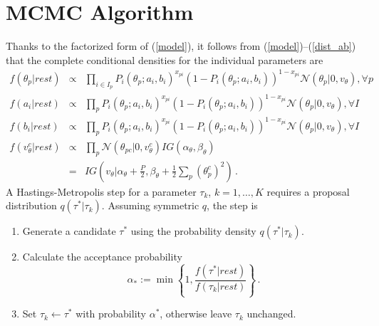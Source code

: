 \documentclass{article}
\newcommand{\Normal}{\mathcal{N}}
\newcommand{\st}{v_{\ta}}
\newcommand{\ta}{\theta}
\begin{document}
\section{MCMC Algorithm}
Thanks to the factorized form of (\ref{model}), it follows from (\ref{model})--(\ref{dist_ab}) that the complete conditional densities for the individual parameters are
\begin{eqnarray}
  f(\ta_p|rest) &\propto& \prod_{i \in I_p} 
  P_i(\ta_p;a_i,b_i)^{x_{pi}} 
  \left(1 - P_i(\ta_p;a_i,b_i)\right)^{1-x_{pi}} 
  \Normal(\ta_p|0,\st),\forall p\,
  \label{cond_ta}
  \\
  f(a_i|rest) &\propto& \prod_{p} 
  P_i(\ta_p;a_i,b_i)^{x_{pi}} 
  \left(1 - P_i(\ta_p;a_i,b_i)\right)^{1-x_{pi}} 
  \Normal(\ta_p|0,\st),\forall I\,
  \label{cond_a}
  \\
  f(b_i|rest) &\propto& \prod_{p} 
  P_i(\ta_p;a_i,b_i)^{x_{pi}} 
  \left(1 - P_i(\ta_p;a_i,b_i)\right)^{1-x_{pi}} 
  \Normal(\ta_p|0,\st),\forall I\,
  \label{cond_b}
  \\
  f(\st^c|rest) &\propto& \prod_{p} 
  \Normal(\ta_{pc}|0,\st^c) IG(\alpha_{\ta},\beta_{\ta}) \\
  &=& IG\left(\st|\alpha_{\ta} + \frac{P}{2}, \beta_{\ta} + \frac12 \sum_p (\ta_p^c)^2\right)\,.
  \label{cond_st}
\end{eqnarray}
A Hastings-Metropolis step for a parameter $\tau_k$, $k=1,\dots,K$ requires a proposal distribution $q(\tau^*|\tau_k)$. Assuming symmetric $q$, the step is
\begin{enumerate}
	\item Generate a candidate $\tau^*$ using the probability density $q(\tau^*|\tau_k)$.
	\item Calculate the acceptance probability
	\begin{equation}
		\alpha_* := \min\left\{1, \frac{f(\tau^*|rest)}{f(\tau_k|rest)} \right\}\,.
	\end{equation}
	\item Set $\tau_k \leftarrow \tau^*$ with probability $\alpha^*$, otherwise leave $\tau_k$ unchanged.
\end{enumerate}
\end{document}
